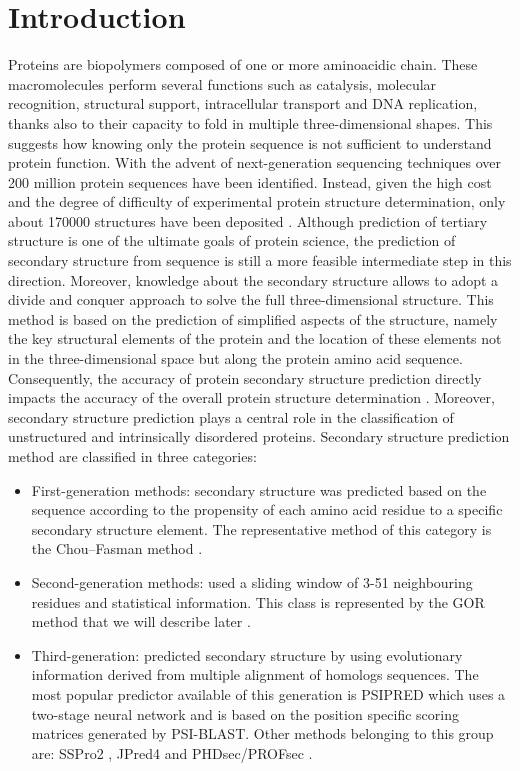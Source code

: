 \documentclass[nocrop]{bioinfo}
\begin{document}
\section{Introduction}
Proteins are biopolymers composed of one or more aminoacidic chain. These macromolecules perform several functions such as catalysis, molecular recognition, structural support, intracellular transport and DNA replication, thanks also to their capacity to fold in multiple three-dimensional shapes. This suggests how knowing only the protein sequence is not sufficient to understand protein function. With the advent of next-generation sequencing techniques over 200 million protein sequences have been identified. Instead, given the high cost and the degree of difficulty of experimental protein structure determination, only about 170000 structures have been deposited \citep{yang2018sixty}. Although prediction of tertiary structure is one of the ultimate goals of protein science, the prediction of secondary structure from sequence is still a more feasible intermediate step in this direction. Moreover, knowledge about the secondary structure allows to adopt a divide and conquer approach to solve the full three-dimensional structure. This method is based on the prediction of simplified aspects of the structure, namely the key structural elements of the protein and the location of these elements not in the three-dimensional space but along the protein amino acid sequence. Consequently, the accuracy of protein secondary structure prediction directly impacts the accuracy of the overall protein structure determination \citep{yang2018sixty}. Moreover, secondary structure prediction plays a central role in the classification of unstructured and intrinsically disordered proteins.  
Secondary structure prediction method are classified in three categories: 
\begin{itemize}
\item First-generation methods: secondary structure was predicted based on the sequence according to the propensity of each amino acid residue to a specific secondary structure element. The representative method of this category is the Chou–Fasman method \citep{chou1974prediction}. 
\item Second-generation methods: used a sliding window of 3-51 neighbouring residues and statistical information. This class is represented by the GOR method that we will describe later \citep{garnier1978analysis}.
\item Third-generation: predicted secondary structure by using evolutionary information derived from multiple alignment of homologs sequences. The most popular predictor available of this generation is PSIPRED \citep{jones1999protein} which uses a two-stage neural network and is based on the position specific scoring matrices generated by PSI-BLAST. Other methods belonging to this group are: SSPro2 \citep{magnan2014sspro}, JPred4 \citep{drozdetskiy2015jpred4} and PHDsec/PROFsec \citep{rost1993improved}.
\end{itemize}
\end{document}
